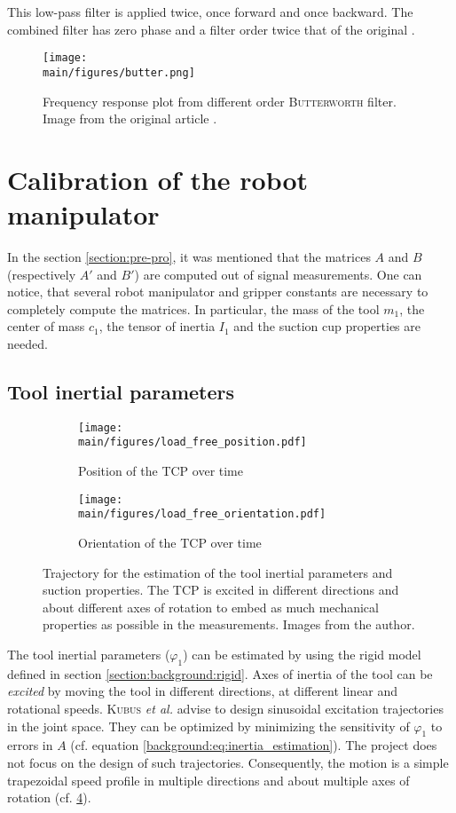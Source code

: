 \documentclass[/home/francois/latex/report/main.tex]{subfiles}
\begin{document}
This low-pass filter is applied twice, once forward and once backward. The combined filter has zero phase and a filter order twice that of the original \cite{SciPy2019}.

\begin{figure}[h]
  \centering
  \texttt{[image: \\main/figures/butter.png]}
  \caption{Frequency response plot from different order \textsc{Butterworth} filter. Image from the original article  \cite{filter1923}.}
  \label{fig:method:butter}
\end{figure}

\section{Calibration of the robot manipulator}

In the section \ref{section:pre-pro}, it was mentioned that the matrices $A$ and $B$ (respectively $A'$ and $B'$) are computed out of signal measurements. One can notice, that several robot manipulator and gripper constants are necessary to completely compute the matrices. In particular, the mass of the tool $m_1$, the center of mass $c_1$, the tensor of inertia $I_1$ and the suction cup properties are needed.

\subsection{Tool inertial parameters}
\label{method:calib:tool}


\begin{figure}[h]
\centering
\begin{subfigure}{\textwidth}
\centering
\texttt{[image: \\main/figures/load\_free\_position.pdf]}
\caption{Position of the \ac{TCP} over time}
\label{fig:method:position}
\end{subfigure}
\begin{subfigure}{\textwidth}
\centering
\texttt{[image: \\main/figures/load\_free\_orientation.pdf]}
\caption{Orientation of the \ac{TCP} over time}
\label{fig:method:orientation}
\end{subfigure}
\caption{Trajectory for the estimation of the tool inertial parameters and suction properties. The \ac{TCP} is excited in different directions and about different axes of rotation to embed as much mechanical properties as possible in the measurements. Images from the author.}
\label{fig:method:trajectory}
\end{figure}

The tool inertial parameters ($\varphi_1$) can be estimated by using the rigid model defined in section \ref{section:background:rigid}. Axes of inertia of the tool can be \textit{excited} by moving the tool in different directions, at different linear and rotational speeds. \textsc{Kubus} \textit{et al.} \cite{Kubus2008} advise to design sinusoidal excitation trajectories in the joint space. They can be optimized by minimizing the sensitivity of $\varphi_1$ to errors in $A$ (cf. equation \ref{background:eq:inertia_estimation}). The project does not focus on the design of such trajectories. Consequently, the motion is a simple trapezoidal speed profile in multiple directions and about multiple axes of rotation (cf. \ref{fig:method:trajectory}).
\end{document}
